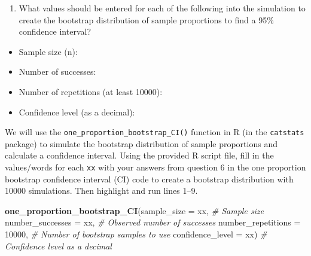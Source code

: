\documentclass[
]{report}
\newenvironment{Shaded}{\begin{snugshade}}{\end{snugshade}}
\newcommand{\AttributeTok}[1]{\textcolor[rgb]{0.13,0.29,0.53}{#1}}
\newcommand{\CommentTok}[1]{\textcolor[rgb]{0.56,0.35,0.01}{\textit{#1}}}
\newcommand{\DecValTok}[1]{\textcolor[rgb]{0.00,0.00,0.81}{#1}}
\newcommand{\FunctionTok}[1]{\textcolor[rgb]{0.13,0.29,0.53}{\textbf{#1}}}
\newcommand{\NormalTok}[1]{#1}
\providecommand{\tightlist}{%
  \setlength{\itemsep}{0pt}\setlength{\parskip}{0pt}}
\begin{document}
\begin{enumerate}
\def\labelenumi{\arabic{enumi}.}
\setcounter{enumi}{5}
\tightlist
\item
  What values should be entered for each of the following into the simulation to create the bootstrap distribution of sample proportions to find a 95\% confidence interval?
  \vspace{1mm}
\end{enumerate}

\begin{itemize}
\tightlist
\item
  Sample size (n):
\end{itemize}

\vspace{.1in}

\begin{itemize}
\tightlist
\item
  Number of successes:
\end{itemize}

\vspace{.1in}

\begin{itemize}
\tightlist
\item
  Number of repetitions (at least 10000):
\end{itemize}

\vspace{.1in}

\begin{itemize}
\tightlist
\item
  Confidence level (as a decimal):
\end{itemize}

\vspace{.1in}

We will use the \texttt{one\_proportion\_bootstrap\_CI()} function in R (in the \texttt{catstats} package) to simulate the bootstrap distribution of sample proportions and calculate a confidence interval. Using the provided R script file, fill in the values/words for each \texttt{xx} with your answers from question 6 in the one proportion bootstrap confidence interval (CI) code to create a bootstrap distribution with 10000 simulations. Then highlight and run lines 1--9.

\begin{Shaded}
\begin{Highlighting}[]
\FunctionTok{one\_proportion\_bootstrap\_CI}\NormalTok{(}\AttributeTok{sample\_size =}\NormalTok{ xx, }\CommentTok{\# Sample size}
                    \AttributeTok{number\_successes =}\NormalTok{ xx, }\CommentTok{\# Observed number of successes}
                    \AttributeTok{number\_repetitions =} \DecValTok{10000}\NormalTok{, }\CommentTok{\# Number of bootstrap samples to use}
                    \AttributeTok{confidence\_level =}\NormalTok{ xx) }\CommentTok{\# Confidence level as a decimal}
\end{Highlighting}
\end{Shaded}
\end{document}
